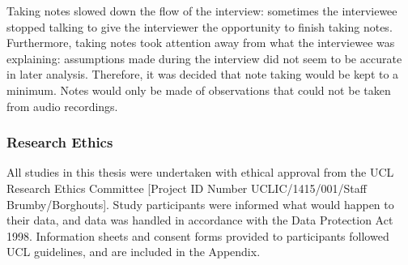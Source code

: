 Taking notes slowed down the flow of the interview: sometimes the interviewee stopped talking to give the interviewer the opportunity to finish taking notes. Furthermore, taking notes took attention away from what the interviewee was explaining: assumptions made during the interview did not seem to be accurate in later analysis. Therefore, it was decided that note taking would be kept to a minimum. Notes would only be made of observations that could not be taken from audio recordings.


\subsubsection{Research Ethics}
All studies in this thesis were undertaken with ethical approval from the UCL Research Ethics Committee [Project ID Number UCLIC/1415/001/Staff Brumby/Borghouts]. Study participants were informed what would happen to their data, and data was handled in accordance with the Data Protection Act 1998. Information sheets and consent forms provided to participants followed UCL guidelines, and are included in the Appendix. 

